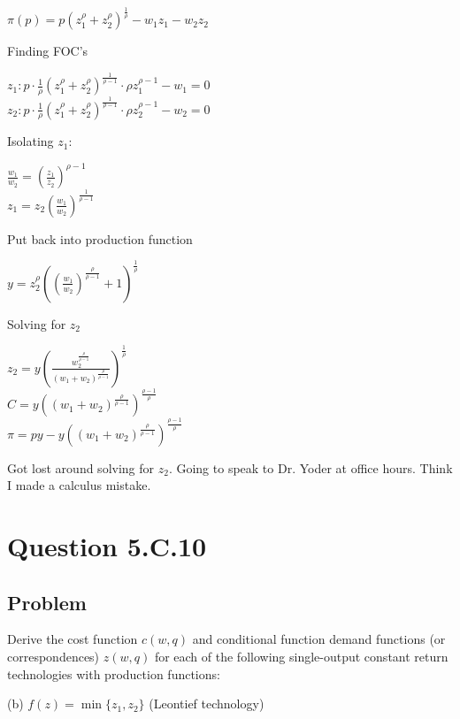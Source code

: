 \documentclass[10pt, a4paper]{article}
\begin{document}
      \begin{center}
        $\pi(p)=p(z_1^{\rho}+z_2^{\rho})^{\frac{1}{\rho}}-w_1z_1-w_2z_2$ \\
      \end{center}
      Finding FOC's
      \begin{center}
        $z_1: p\cdot\frac{1}{\rho}(z_1^{\rho}+z_2^{\rho})^{\frac{1}{\rho-1}}\cdot\rho z_1^{\rho-1} - w_1 = 0$ \\
        $z_2: p\cdot\frac{1}{\rho}(z_1^{\rho}+z_2^{\rho})^{\frac{1}{\rho-1}}\cdot\rho z_2^{\rho-1} - w_2 = 0$ \\
      \end{center}
      Isolating $z_1$:
      \begin{center}
        $\frac{w_1}{w_2}=(\frac{z_1}{z_2})^{\rho-1}$ \\
        $z_1 = z_2(\frac{w_1}{w_2})^{\frac{1}{\rho-1}}$
      \end{center}
      Put back into production function
      \begin{center}
        $y = z_2^{\rho}((\frac{w_1}{w_2})^{\frac{\rho}{\rho-1}}+1)^{\frac{1}{\rho}}$ 
      \end{center}
      Solving for $z_2$
      \begin{center}
        $z_2 = y(\frac{w_2^{\frac{\rho}{\rho-1}}}{(w_1+w_2)^{\frac{\rho}{\rho-1}}})^{\frac{1}{\rho}}$ \\
        $C = y((w_1+w_2)^{\frac{\rho}{\rho-1}})^{\frac{\rho-1}{\rho}}$ \\
        $\pi = py-y((w_1+w_2)^{\frac{\rho}{\rho-1}})^{\frac{\rho-1}{\rho}}$ \\
      \end{center}
      Got lost around solving for $z_2$. Going to speak to Dr. Yoder at office hours. Think I made a calculus mistake.


\section{Question 5.C.10}
    \subsection*{Problem}
      Derive the cost function $c(w,q)$ and conditional function demand functions (or correspondences) $z(w,q)$ for each of the following single-output constant return technologies with production functions:

      (b) $f(z)=\min\{z_1,z_2\}$ (Leontief technology)
        
\end{document}
